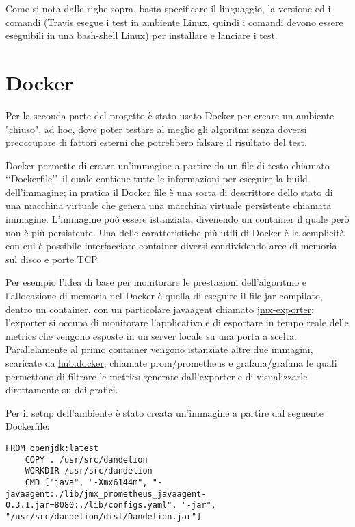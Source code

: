 Come si nota dalle righe sopra, basta specificare il linguaggio, la versione ed i comandi (Travis esegue i test in ambiente Linux, quindi i comandi devono essere eseguibili in una bash-shell Linux) 
per installare e lanciare i test.

\section{Docker}
Per la seconda parte del progetto è stato usato Docker per creare un ambiente "chiuso", ad hoc, dove poter testare al meglio gli algoritmi senza doversi preoccupare di fattori esterni che potrebbero falsare 
il risultato del test. 

Docker permette di creare un'immagine a partire da un file di testo chiamato \lq\lq Dockerfile\rq\rq\ il quale contiene tutte le informazioni per eseguire la build dell'immagine; in pratica 
il Docker file è una sorta di descrittore dello stato di una macchina virtuale che genera una macchina virtuale persistente chiamata immagine. L'immagine può essere istanziata, divenendo un container 
il quale però non è più persistente. Una delle caratteristiche più utili di Docker è la semplicità con cui è possibile interfacciare container diversi condividendo aree di memoria sul disco e porte TCP.

Per esempio l'idea di base per monitorare le prestazioni dell'algoritmo e l'allocazione di memoria nel Docker è quella di eseguire il file jar compilato, dentro un container, con un particolare javaagent chiamato 
\href{https://github.com/prometheus/jmx_exporter}{jmx-exporter}; l'exporter si occupa di monitorare l'applicativo e di esportare in tempo reale delle metrics che vengono esposte in un server locale su una porta a scelta.
Parallelamente al primo container vengono istanziate altre due immagini, scaricate da \href{https://hub.docker.com/}{hub.docker}, chiamate prom/prometheus e grafana/grafana le quali permettono di filtrare le metrics 
generate dall'exporter e di visualizzarle direttamente su dei grafici. 

Per il setup dell'ambiente è stato creata un'immagine a partire dal seguente Dockerfile:

\begin{lstlisting}[style=YmlStyle]
    FROM openjdk:latest
    COPY . /usr/src/dandelion
    WORKDIR /usr/src/dandelion
    CMD ["java", "-Xmx6144m", "-javaagent:./lib/jmx_prometheus_javaagent-0.3.1.jar=8080:./lib/configs.yaml", "-jar", "/usr/src/dandelion/dist/Dandelion.jar"]
\end{lstlisting}


